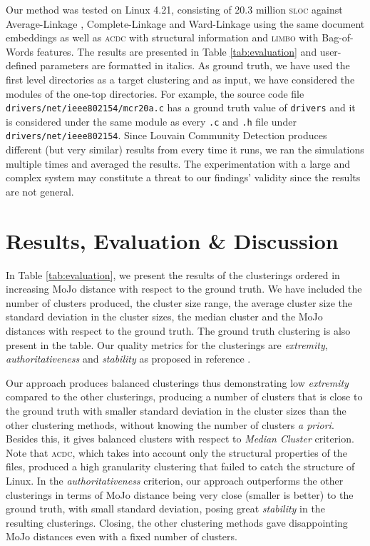 \documentclass[sigconf, screen]{acmart}
\begin{document}
 Our method was tested on Linux 4.21,
consisting of 20.3 million \textsc{sloc} against Average-Linkage \cite{average}, Complete-Linkage \cite{complete} 
and Ward-Linkage \cite{ward} using the same document embeddings
as well as \textsc{acdc} with structural information \cite{acdc} and \textsc{limbo} \cite{limbo} with Bag-of-Words features. The results are presented in Table \ref{tab:evaluation} and user-defined parameters are formatted in italics. 
As ground truth, we have used the first level directories as a target clustering and as input, we have considered 
the modules of the one-top directories. 
For example, the source code file \texttt{drivers/net/ieee802154\-/mcr20a.c} has a ground truth value of \texttt{drivers} 
and it is considered under the same module as every \texttt{.c} and \texttt{.h} file under \texttt{drivers/net/ieee802154}. Since Louvain Community Detection produces different (but very similar) results from every time it runs, we ran the simulations 
multiple times and averaged the results. 
The experimentation with a large and complex system may constitute a threat to our findings' validity since the results are not general.  


\section{Results, Evaluation \& Discussion}

In Table \ref{tab:evaluation}, we present the results of the clusterings ordered in increasing MoJo distance 
with respect to the ground truth. 
We have included the number of clusters produced, the cluster size range, the average cluster size the standard
deviation in the cluster sizes, the median cluster and the MoJo distances with respect to the ground truth. 
The ground truth clustering is also present in the table. 
Our quality metrics for the clusterings are 
\emph{extremity}, \emph{authoritativeness} and \emph{stability} as proposed in reference \cite{evaluation}.

Our approach produces balanced clusterings thus demonstrating low \emph{extremity} compared to the other clusterings, 
producing a number of clusters that is close to the ground truth with smaller standard deviation in the cluster sizes than 
the other clustering methods, without knowing the number of clusters \emph{a priori}. 
Besides this, it gives balanced clusters with respect to \emph{Median Cluster} criterion. 
Note that \textsc{acdc}, which takes into account only the structural properties of the files, produced a high 
granularity clustering that failed to catch the structure of Linux. 
In the \emph{authoritativeness} criterion, our approach outperforms the other clusterings
in terms of MoJo distance being very close (smaller is better) to the ground truth, with small standard deviation, posing great \emph{stability} in the resulting clusterings. 
Closing, the other clustering methods gave disappointing MoJo distances even with a fixed number of clusters. 
\end{document}
